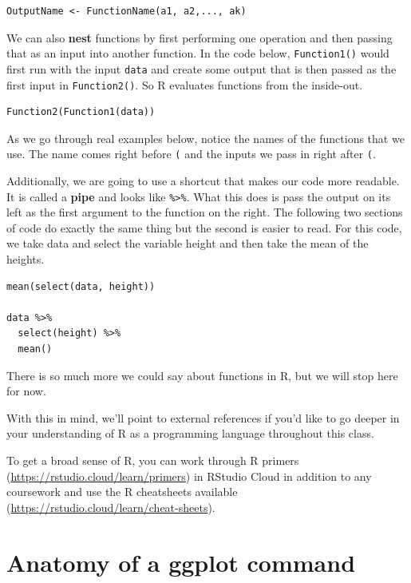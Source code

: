 \documentclass[]{book}
\begin{document}
\begin{verbatim}
OutputName <- FunctionName(a1, a2,..., ak)
\end{verbatim}

We can also \textbf{nest} functions by first performing one operation and then passing that as an input into another function. In the code below, \texttt{Function1()} would first run with the input \texttt{data} and create some output that is then passed as the first input in \texttt{Function2()}. So R evaluates functions from the inside-out.

\begin{verbatim}
Function2(Function1(data))
\end{verbatim}

As we go through real examples below, notice the names of the functions that we use. The name comes right before \texttt{(} and the inputs we pass in right after \texttt{(}.

Additionally, we are going to use a shortcut that makes our code more readable. It is called a \textbf{pipe} and looks like \texttt{\%\textgreater{}\%}. What this does is pass the output on its left as the first argument to the function on the right. The following two sections of code do exactly the same thing but the second is easier to read. For this code, we take data and select the variable height and then take the mean of the heights.

\begin{verbatim}
mean(select(data, height))

data %>%
  select(height) %>%
  mean()
\end{verbatim}

There is so much more we could say about functions in R, but we will stop here for now.

With this in mind, we'll point to external references if you'd like to go deeper in your understanding of R as a programming language throughout this class.

To get a broad sense of R, you can work through R primers (\url{https://rstudio.cloud/learn/primers}) in RStudio Cloud in addition to any coursework and use the R cheatsheets available (\url{https://rstudio.cloud/learn/cheat-sheets}).

\hypertarget{anatomy-of-a-ggplot-command}{%
\section{Anatomy of a ggplot command}\label{anatomy-of-a-ggplot-command}}
\end{document}
